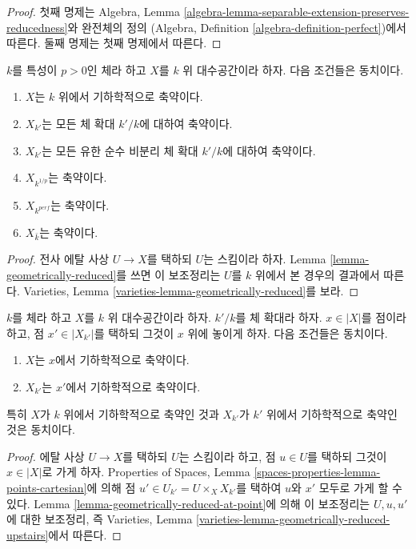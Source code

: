 \begin{proof}
첫째 명제는 Algebra, Lemma
\ref{algebra-lemma-separable-extension-preserves-reducedness}와 완전체의 정의
(Algebra, Definition \ref{algebra-definition-perfect})에서 따른다.
둘째 명제는 첫째 명제에서 따른다.
\end{proof}

\begin{lemma}
\label{lemma-geometrically-reduced-positive-characteristic}
$k$를 특성이 $p > 0$인 체라 하고 $X$를 $k$ 위 대수공간이라 하자.
다음 조건들은 동치이다.
\begin{enumerate}
\item $X$는 $k$ 위에서 기하학적으로 축약이다.
\item $X_{k'}$는 모든 체 확대 $k'/k$에 대하여 축약이다.
\item $X_{k'}$는 모든 유한 순수 비분리 체 확대 $k'/k$에 대하여 축약이다.
\item $X_{k^{1/p}}$는 축약이다.
\item $X_{k^{perf}}$는 축약이다.
\item $X_{\bar k}$는 축약이다.
\end{enumerate}
\end{lemma}

\begin{proof}
전사 에탈 사상 $U \to X$를 택하되 $U$는 스킴이라 하자. Lemma
\ref{lemma-geometrically-reduced}를 쓰면 이 보조정리는 $U$를 $k$ 위에서
본 경우의 결과에서 따른다. Varieties, Lemma
\ref{varieties-lemma-geometrically-reduced}를 보라.
\end{proof}

\begin{lemma}
\label{lemma-geometrically-reduced-upstairs}
$k$를 체라 하고 $X$를 $k$ 위 대수공간이라 하자. $k'/k$를 체 확대라 하자.
$x \in |X|$를 점이라 하고, 점 $x' \in |X_{k'}|$를 택하되 그것이
$x$ 위에 놓이게 하자. 다음 조건들은 동치이다.
\begin{enumerate}
\item $X$는 $x$에서 기하학적으로 축약이다.
\item $X_{k'}$는 $x'$에서 기하학적으로 축약이다.
\end{enumerate}
특히 $X$가 $k$ 위에서 기하학적으로 축약인 것과 $X_{k'}$가 $k'$ 위에서
기하학적으로 축약인 것은 동치이다.
\end{lemma}

\begin{proof}
에탈 사상 $U \to X$를 택하되 $U$는 스킴이라 하고, 점 $u \in U$를 택하되
그것이 $x \in |X|$로 가게 하자. Properties of Spaces, Lemma
\ref{spaces-properties-lemma-points-cartesian}에 의해
점 $u' \in U_{k'} = U \times_X X_{k'}$를 택하여 $u$와 $x'$ 모두로
가게 할 수 있다. Lemma
\ref{lemma-geometrically-reduced-at-point}에 의해 이 보조정리는 $U, u, u'$에
대한 보조정리, 즉 Varieties, Lemma
\ref{varieties-lemma-geometrically-reduced-upstairs}에서 따른다.
\end{proof}

